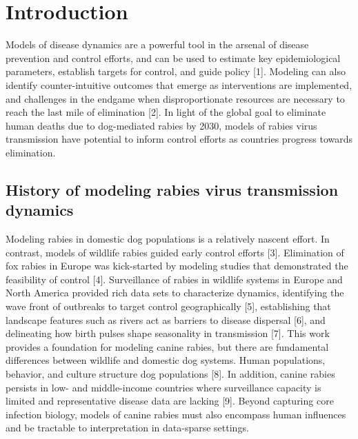 \documentclass[
  oneside]{book}
\begin{document}
\hypertarget{introduction-3}{%
\section{Introduction}\label{introduction-3}}

Models of disease dynamics are a powerful tool in the arsenal of disease
prevention and control efforts, and can be used to estimate key
epidemiological parameters, establish targets for control, and guide
policy {[}1{]}. Modeling can also identify counter-intuitive outcomes that
emerge as interventions are implemented, and challenges in the endgame
when disproportionate resources are necessary to reach the last mile of
elimination {[}2{]}. In light of the global goal to eliminate human deaths
due to dog-mediated rabies by 2030, models of rabies virus transmission
have potential to inform control efforts as countries progress towards
elimination.

\hypertarget{history-of-modeling-rabies-virus-transmission-dynamics}{%
\subsection{History of modeling rabies virus transmission dynamics}\label{history-of-modeling-rabies-virus-transmission-dynamics}}

Modeling rabies in domestic dog populations is a relatively nascent
effort. In contrast, models of wildlife rabies guided early control
efforts {[}3{]}. Elimination of fox rabies in Europe was kick-started by
modeling studies that demonstrated the feasibility of control {[}4{]}.
Surveillance of rabies in wildlife systems in Europe and North America
provided rich data sets to characterize dynamics, identifying the wave
front of outbreaks to target control geographically {[}5{]}, establishing
that landscape features such as rivers act as barriers to disease
dispersal {[}6{]}, and delineating how birth pulses shape seasonality in
transmission {[}7{]}. This work provides a foundation for modeling canine
rabies, but there are fundamental differences between wildlife and
domestic dog systems. Human populations, behavior, and culture structure
dog populations {[}8{]}. In addition, canine rabies persists in low- and
middle-income countries where surveillance capacity is limited and
representative disease data are lacking {[}9{]}. Beyond capturing core
infection biology, models of canine rabies must also encompass human
influences and be tractable to interpretation in data-sparse settings.
\end{document}
